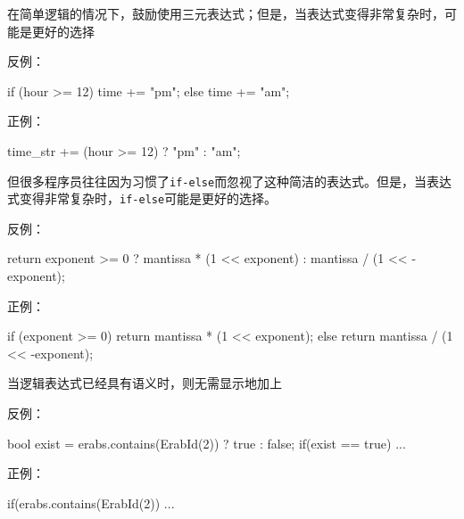 \begin{content}
\begin{regulation}
在简单逻辑的情况下，鼓励使用三元表达式；但是，当表达式变得非常复杂时，可能是更好的选择
\end{regulation}

反例：
\begin{leftbar}
\begin{c++}
if (hour >= 12) 
{
    time += "pm";
} 
else 
{
    time += "am";
}
\end{c++}
\end{leftbar}

正例：
\begin{leftbar}
\begin{c++}
time_str += (hour >= 12) ? "pm" : "am";
\end{c++}
\end{leftbar}

但很多程序员往往因为习惯了\texttt{if-else}而忽视了这种简洁的表达式。但是，当表达式变得非常复杂时，\texttt{if-else}可能是更好的选择。

反例：
\begin{leftbar}
\begin{c++}
return exponent >= 0 ? mantissa * (1 << exponent) : mantissa / (1 << -exponent);
\end{c++}
\end{leftbar}

正例：
\begin{leftbar}
\begin{c++}
if (exponent >= 0)
{
    return mantissa * (1 << exponent);
}
else
{
    return mantissa / (1 << -exponent);
}
\end{c++}
\end{leftbar}

\begin{regulation}
当逻辑表达式已经具有语义时，则无需显示地加上
\end{regulation}

反例：
\begin{leftbar}
\begin{c++}
bool exist = erabs.contains(ErabId(2)) ? true : false;
if(exist == true)
{
    ...
}
\end{c++}
\end{leftbar}

正例：
\begin{leftbar}
\begin{c++}
if(erabs.contains(ErabId(2))
{
    ...
}
\end{c++}
\end{leftbar}


\end{content}
